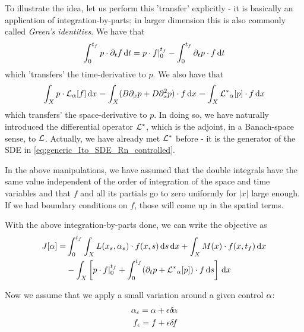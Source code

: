 To illustrate the idea, let us perform this 'transfer' explicitly - it is basically an
application of integration-by-parts; in larger dimension this is also commonly
called {\sl Green's identities}.  We have that $$
 \int_0^{ t_f }   p \cdot {\partial}_t f   \, \mathrm{d} t =
  p\cdot f|_0^{ t_f } - \int_0^{ t_f }   {\partial}_t p \cdot   f  \, \mathrm{d} t
$$ which 'transfers' the time-derivative to $p$. We also have that $$ \int_X  p \cdot 
{ \mathcal{L} }_{\alpha} [f ]  \, \mathrm{d} x = \int_X  ( B  {\partial}_x p + D {\partial}_x^2 p) \cdot  f  \, \mathrm{d} x =
\int_X   { { \mathcal{L} }^* }_{\alpha} [p] \cdot f  \, \mathrm{d} x $$ which transfers' the
space-derivative to $p$. In doing so, we have  naturally introduced 
 the differential operator ${ { \mathcal{L} }^* }$, which is the adjoint, in a Banach-space
 sense, to ${ \mathcal{L} }$. Actually, we have already met ${ { \mathcal{L} }^* }$ before - it is the
 generator of the SDE in \cref{eq:generic_Ito_SDE_Rn_controlled}.

In the above manipulations, we have assumed that the double integrals have the
same value independent of the order of integration of the space and time
variables  and that $f$ and all its partials go to zero uniformly for $|x|$
large enough. If we had boundary conditions on $f$, those will come up in the
spatial terms.

With the above integration-by-parts done, we can write the objective as
\begin{align}
J[\alpha] =& \int_0^{ t_f }\int_X L(x_s, \alpha_s) \cdot f(x,s) \, \mathrm{d} s\, \mathrm{d} x 
+ \int_X  M(x)\cdot f(x,{ t_f }) \, \mathrm{d} x \notag
\\ &- 
\int_X  \left[ p\cdot f|_0^{ t_f }  +
    \int_0^{ t_f }  ({\partial}_t p  + { { \mathcal{L} }^* }_{\alpha} [p]) \cdot f  \, \mathrm{d} s \right] \, \mathrm{d} x 
\label{eq:generic_objective_functional_in_terms_of_forward_density_adjointed}
\end{align}

Now we assume that we apply a small variation around a given control $\alpha$: 
\begin{align*}
\alpha_{\epsilon} = \alpha + {\epsilon} { \delta\! \alpha}
\\
f_{\epsilon} = f + {\epsilon} { \delta\! f}
\end{align*}

